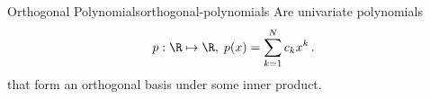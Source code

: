 \begin{definition}{Orthogonal Polynomials}{orthogonal-polynomials}
  Are univariate polynomials
  $$p: \R \mapsto \R, \; p(x) = \sum_{k=1}^N c_k x^k\,.$$
  that form an orthogonal basis under some inner product.
\end{definition}
